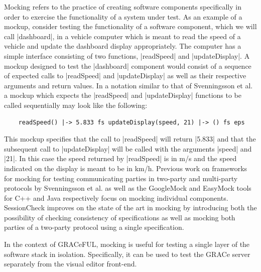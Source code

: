 \documentclass{article}
\begin{document}
Mocking refers to the practice of creating software components specifically
in order to exercise the functionality of a system under test.
%
As an example of a mockup, consider testing the functionality of a software
component, which we will call |dashboard|, in a vehicle computer which is
meant to read the speed of a vehicle and update the dashboard display
appropriately.
%
The computer has a simple interface consisting of two functions,
|readSpeed| and |updateDisplay|.
%
A mockup designed to test the |dashboard| component would consist of a sequence
of expected calls to |readSpeed| and |updateDisplay| as well as their
respective arguments and return values.
%
In a notation similar to that of Svenningsson et al. \cite{HughesMocking}
a mockup which expects the |readSpeed| and |updateDisplay| functions to be
called sequentially may look like the following:
%
\begin{verbatim}
    readSpeed() |-> 5.833 fs updateDisplay(speed, 21) |-> () fs eps
\end{verbatim}
%
This mockup specifies that the call to |readSpeed| will return |5.833| and that
the subsequent call to |updateDisplay| will be called with the arguments
|speed| and |21|.
%
In this case the speed returned by |readSpeed| is in m/s and the speed indicated
on the display is meant to be in km/h.
%
Previous work on frameworks for mocking for testing communicating parties
in two-party and multi-party protocols by Svenningsson et al. \cite{HughesMocking}
as well as the GoogleMock \cite{GoogleMock} and EasyMock \cite{EasyMock} tools
for C++ and Java respectively focus on mocking individual components.
%
SessionCheck improves on the state of the art in mocking by introducing
both the possibility of checking consistency of specifications as well as
mocking both parties of a two-party protocol using a single specification.
%

In the context of GRACeFUL, mocking is useful for testing a single
layer of the software stack in isolation.
%
Specifically, it can be used to test the GRACe server separately from
the visual editor front-end.
\end{document}
